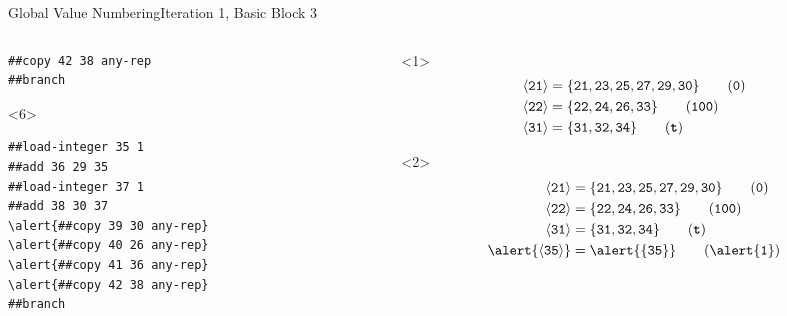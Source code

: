 \documentclass{beamer}
\newcommand{\vn}[1]{\ensuremath{\langle\texttt{#1}\rangle}}
\newcommand{\vreg}[1]{\texttt{#1}}
\begin{document}
\begin{frame}[fragile]{Global Value Numbering}{Iteration 1, Basic Block 3}
\begin{columns}[t,onlytextwidth]
\begin{column}[t]{.5\textwidth}
\begin{onlyenv}
\begin{Verbatim}[frame=single,commandchars=\\\{\}]
##copy 42 38 any-rep
##branch
        \end{Verbatim}
      \end{onlyenv}
      \begin{onlyenv}<6>
        \begin{Verbatim}[frame=single,commandchars=\\\{\}]
##load-integer 35 1
##add 36 29 35
##load-integer 37 1
##add 38 30 37
\alert{##copy 39 30 any-rep}
\alert{##copy 40 26 any-rep}
\alert{##copy 41 36 any-rep}
\alert{##copy 42 38 any-rep}
##branch
        \end{Verbatim}
      \end{onlyenv}
    \end{column}
    \begin{column}{.5\textwidth}
      \begin{onlyenv}<1>
        \begin{align*}
          \vn{21} &= \{\vreg{21},
                       \vreg{23},
                       \vreg{25},
                       \vreg{27},
                       \vreg{29},
                       \vreg{30}\} \tag{\texttt{0}} \\
          \vn{22} &= \{\vreg{22},
                       \vreg{24},
                       \vreg{26},
                       \vreg{33}\} \tag{\texttt{100}} \\
          \vn{31} &= \{\vreg{31},
                       \vreg{32},
                       \vreg{34}\} \tag{\texttt{\textbf{t}}}
        \end{align*}
      \end{onlyenv}
      \begin{onlyenv}<2>
        \begin{align*}
          \vn{21} &= \{\vreg{21},
                       \vreg{23},
                       \vreg{25},
                       \vreg{27},
                       \vreg{29},
                       \vreg{30}\} \tag{\texttt{0}} \\
          \vn{22} &= \{\vreg{22},
                       \vreg{24},
                       \vreg{26},
                       \vreg{33}\} \tag{\texttt{100}} \\
          \vn{31} &= \{\vreg{31},
                       \vreg{32},
                       \vreg{34}\} \tag{\texttt{\textbf{t}}} \\
          \alert{\vn{35}} &= \alert{\{\vreg{35}\}} \tag{\alert{\texttt{1}}}
        \end{align*}
      \end{onlyenv}

\end{column}
\end{columns}
\end{frame}
\end{document}
